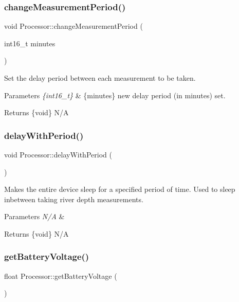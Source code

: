 \subsubsection{\texorpdfstring{change\+Measurement\+Period()}{changeMeasurementPeriod()}}
{\footnotesize\ttfamily void Processor\+::change\+Measurement\+Period (\begin{DoxyParamCaption}\item[{int16\+\_\+t}]{minutes }\end{DoxyParamCaption})}

Set the delay period between each measurement to be taken. 
\begin{DoxyParams}{Parameters}
{\em \{int16\+\_\+t\}} & \{minutes\} new delay period (in minutes) set. \\
\hline
\end{DoxyParams}
\begin{DoxyReturn}{Returns}
\{void\} N/A 
\end{DoxyReturn}
\mbox{\label{class_processor_a6ad79126a7694ed86f3f5ccc36b606bd}} 
\subsubsection{\texorpdfstring{delay\+With\+Period()}{delayWithPeriod()}}
{\footnotesize\ttfamily void Processor\+::delay\+With\+Period (\begin{DoxyParamCaption}{ }\end{DoxyParamCaption})}

Makes the entire device sleep for a specified period of time. Used to sleep inbetween taking river depth measurements. 
\begin{DoxyParams}{Parameters}
{\em N/A} & \\
\hline
\end{DoxyParams}
\begin{DoxyReturn}{Returns}
\{void\} N/A 
\end{DoxyReturn}
\mbox{\label{class_processor_aa467c82cb9a57d597487fc319c878c36}} 
\subsubsection{\texorpdfstring{get\+Battery\+Voltage()}{getBatteryVoltage()}}
{\footnotesize\ttfamily float Processor\+::get\+Battery\+Voltage (\begin{DoxyParamCaption}{ }\end{DoxyParamCaption})}

